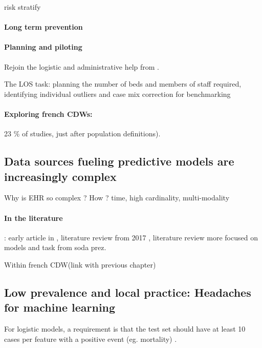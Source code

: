 \documentclass[french,12pt,twoside,a4paper]{book}
\begin{document}
risk stratify \citep{tang2007global}

\paragraph{Long term prevention}


\paragraph{Planning and piloting}

Rejoin the logistic and administrative help from \cite{topol2019high}.

The LOS task: planning the number of beds and members of staff required,
identifying individual outliers and case mix correction for benchmarking \citep{verburg2017models}

\paragraph{Exploring french CDWs:} 23 \% of studies, just after population definitions).

\subsection{Data sources fueling predictive models are increasingly complex}\label{subsec:predictive_models:complex_data}

Why is EHR so complex ? How ? time, high cardinality, multi-modality

\paragraph{In the literature}: early article in \cite{wu2010prediction},
literature review from 2017 \citep{goldstein2017opportunities}, literature
review more focused on models and task from soda prez.

Within french CDW(link with previous chapter)

\subsection{Low prevalence and local practice: Headaches for machine learning}\label{subsec:predictive_models:low_prevalence}

For logistic models, a requirement is that the test set should have at least 10
cases per feature with a positive event (eg. mortality)
\citep{harrell1985regression,wyatt1995commentary}.
\end{document}
